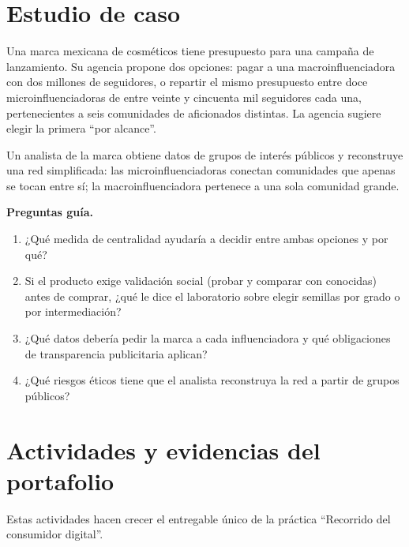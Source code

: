 \section{Estudio de caso}
\label{sec:cap08-caso}

\begin{casoFicticio}
Una marca mexicana de cosméticos tiene presupuesto para una campaña de
lanzamiento. Su agencia propone dos opciones: pagar a una macroinfluenciadora
con dos millones de seguidores, o repartir el mismo presupuesto entre doce
microinfluenciadoras de entre veinte y cincuenta mil seguidores cada una,
pertenecientes a seis comunidades de aficionados distintas. La agencia
sugiere elegir la primera \enquote{por alcance}.

Un analista de la marca obtiene datos de grupos de interés públicos y
reconstruye una red simplificada: las microinfluenciadoras conectan
comunidades que apenas se tocan entre sí; la macroinfluenciadora pertenece
a una sola comunidad grande.

\textbf{Preguntas guía.}
\begin{enumerate}
  \item ¿Qué medida de centralidad ayudaría a decidir entre ambas opciones y
  por qué?
  \item Si el producto exige validación social (probar y comparar con
  conocidas) antes de comprar, ¿qué le dice el laboratorio sobre elegir
  semillas por grado o por intermediación?
  \item ¿Qué datos debería pedir la marca a cada influenciadora y qué
  obligaciones de transparencia publicitaria aplican?
  \item ¿Qué riesgos éticos tiene que el analista reconstruya la red a partir
  de grupos públicos?
\end{enumerate}
\end{casoFicticio}

\section{Actividades y evidencias del portafolio}

Estas actividades hacen crecer el entregable único de la práctica
\enquote{Recorrido del consumidor digital}.

